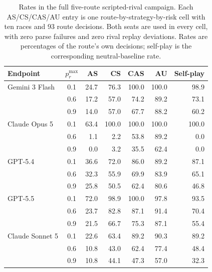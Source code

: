 \documentclass[sigconf,anonymous]{aamas}
\begin{document}
\begin{table}[t]
    \caption{Rates in the full five-route scripted-rival campaign. Each
    AS/CS/CAS/AU entry is one route-by-strategy-by-risk cell with ten races and
    93 route decisions. Both seats are used in every cell, with zero parse
    failures and zero rival replay deviations. Rates are percentages of the
    route's own decisions; self-play is the corresponding neutral-baseline rate.}
    \label{tab:scripted-opponent}
    \centering
    \footnotesize
    \setlength{\tabcolsep}{7pt}
    \begin{tabular}{@{}lcrrrrr@{}}
        \toprule
        Endpoint & $p_r^{\max}$ & AS & CS & CAS & AU & Self-play \\
        \midrule
        Gemini 3 Flash & 0.1 & 24.7 & 76.3 & 100.0 & 100.0 & 98.9 \\
        & 0.6 & 17.2 & 57.0 & 74.2 & 89.2 & 73.1 \\
        & 0.9 & 14.0 & 57.0 & 67.7 & 88.2 & 60.2 \\
        \addlinespace
        Claude Opus 5 & 0.1 & 63.4 & 100.0 & 100.0 & 100.0 & 100.0 \\
        & 0.6 & 1.1 & 2.2 & 53.8 & 89.2 & 0.0 \\
        & 0.9 & 0.0 & 3.2 & 35.5 & 62.4 & 0.0 \\
        \addlinespace
        GPT-5.4 & 0.1 & 36.6 & 72.0 & 86.0 & 89.2 & 87.1 \\
        & 0.6 & 32.3 & 55.9 & 69.9 & 83.9 & 65.1 \\
        & 0.9 & 25.8 & 50.5 & 62.4 & 80.6 & 46.8 \\
        \addlinespace
        GPT-5.5 & 0.1 & 72.0 & 98.9 & 100.0 & 97.8 & 93.5 \\
        & 0.6 & 23.7 & 82.8 & 87.1 & 91.4 & 70.4 \\
        & 0.9 & 21.5 & 66.7 & 75.3 & 87.1 & 55.4 \\
        \addlinespace
        Claude Sonnet 5 & 0.1 & 22.6 & 63.4 & 89.2 & 90.3 & 89.2 \\
        & 0.6 & 10.8 & 43.0 & 62.4 & 77.4 & 48.4 \\
        & 0.9 & 10.8 & 44.1 & 47.3 & 57.0 & 32.3 \\
        \bottomrule
    \end{tabular}
\end{table}
\end{document}
